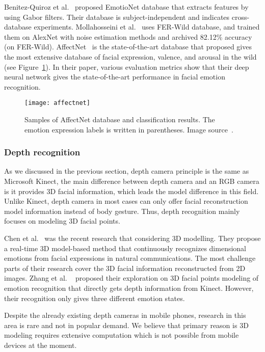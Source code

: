 Benitez-Quiroz et al.~\cite{fabian2016emotionet} proposed EmotioNet database that extracts features by using Gabor filters. Their database is subject-independent and indicates cross-database experiments.
Mollahosseini et al.~\cite{mollahosseini2016facial} uses FER-Wild database, and trained them on AlexNet with noise estimation methods and archived 82.12\% accuracy (on FER-Wild). 
AffectNet~\cite{Mollahosseini2017} is the state-of-the-art database that proposed gives the most extensive database of facial expression, valence, and arousal in the wild (see Figure~\ref{fig:affectnet}). In their paper, various evaluation metrics show that their deep neural network gives the state-of-the-art performance in facial emotion recognition.

\begin{figure}
  \centering
  \texttt{[image: affectnet]}
  \caption{Samples of AffectNet database and classification results. The emotion expression labels is written in parentheses. Image source~\cite{Mollahosseini2017}.}
  \label{fig:affectnet}
\end{figure}

\subsubsection{Depth recognition}

As we discussed in the previous section, depth camera principle is the same as Microsoft Kinect, the main difference between depth camera and an RGB camera is it provides 3D facial information, which leads the model difference in this field. Unlike Kinect, depth camera in most cases can only offer facial reconstruction model information instead of body gesture. Thus, depth recognition mainly focuses on modeling 3D facial points. 

Chen et al.~\cite{chen20153d} was the recent research that considering 3D modelling. They propose a real-time 3D model-based method that continuously recognizes dimensional emotions from facial expressions in natural communications. The most challenge parts of their research cover the 3D facial information reconstructed from 2D images. Zhang et al. ~\cite{zhang2016emotion} proposed their exploration on 3D facial points modeling of emotion recognition that directly gets depth information from Kinect. However, their recognition only gives three different emotion states.

Despite the already existing depth cameras in mobile phones, research in this area is rare and not in popular demand. We believe that primary reason is 3D modeling requires extensive computation which is not possible from mobile devices at the moment.

